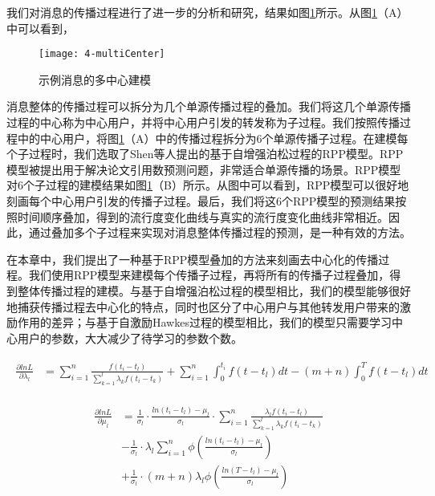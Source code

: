 我们对消息的传播过程进行了进一步的分析和研究，结果如图\ref{fig:multiCenter}所示。从图\ref{fig:multiCenter}（A）中可以看到，
\begin{figure}[!htbp]
  \centering
  \texttt{[image: 4-multiCenter]}
  \caption{示例消息的多中心建模}
  \label{fig:multiCenter}
\end{figure}
消息整体的传播过程可以拆分为几个单源传播过程的叠加。我们将这几个单源传播过程的中心称为中心用户，并将中心用户引发的转发称为子过程。我们按照传播过程中的中心用户，将图\ref{fig:multiCenter}（A）中的传播过程拆分为6个单源传播子过程。在建模每个子过程时，我们选取了Shen等人提出的基于自增强泊松过程的RPP模型。RPP模型被提出用于解决论文引用数预测问题，非常适合单源传播的场景。RPP模型对6个子过程的建模结果如图\ref{fig:multiCenter}（B）所示。从图中可以看到，RPP模型可以很好地刻画每个中心用户引发的传播子过程。最后，我们将这6个RPP模型的预测结果按照时间顺序叠加，得到的流行度变化曲线与真实的流行度变化曲线非常相近。因此，通过叠加多个子过程来实现对消息整体传播过程的预测，是一种有效的方法。

在本章中，我们提出了一种基于RPP模型叠加的方法来刻画去中心化的传播过程。我们使用RPP模型来建模每个传播子过程，再将所有的传播子过程叠加，得到整体传播过程的建模。与基于自增强泊松过程的模型相比，我们的模型能够很好地捕获传播过程去中心化的特点，同时也区分了中心用户与其他转发用户带来的激励作用的差异；与基于自激励Hawkes过程的模型相比，我们的模型只需要学习中心用户的参数，大大减少了待学习的参数个数。


\begin{eqnarray}
\label{eq:gradLambda}
\begin{split}
\frac{\partial lnL}{\partial \lambda_l} & = \sum_{i=1}^{n}\frac{f(t_i-t_l)}{\sum_{k=1}^{l} \lambda_k f(t_i-t_k)} + \sum_{i=1}^{n} \int_{0}^{t_i}f(t-t_l)dt - (m+n)\int_{0}^{T}f(t-t_l)dt
\end{split}
\end{eqnarray}

\begin{eqnarray}
\label{eq:gradMu}
\begin{split}
\frac{\partial lnL}{\partial \mu_l} & = \frac{1}{\sigma_l} \cdot \frac{ln(t_i-t_l)-\mu_l}{\sigma_l} \cdot \sum_{i=1}^{n}\frac{\lambda_l f(t_i-t_l)}{\sum_{k=1}^{l} \lambda_k f(t_i-t_k)} \\
& - \frac{1}{\sigma_l} \cdot\lambda_l \sum_{i=1}^{n} \phi(\frac{ln(t_i-t_l)-\mu_l}{\sigma_l}) \\
& + \frac{1}{\sigma_l}\cdot (m+n)\lambda_l \phi(\frac{ln(T-t_l)-\mu_l}{\sigma_l})
\end{split}
\end{eqnarray}

